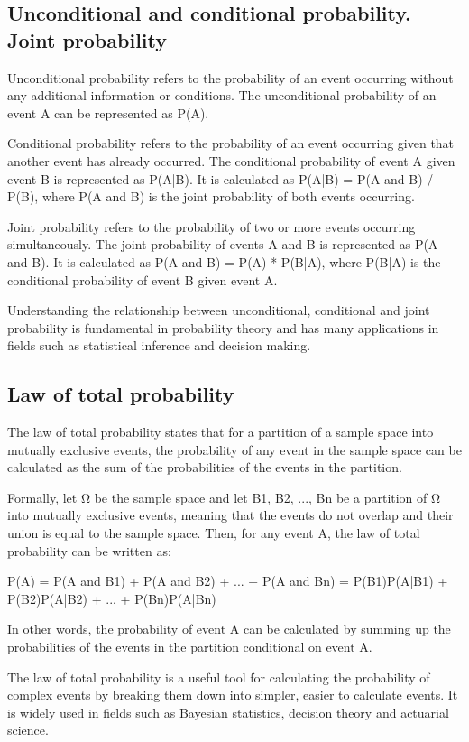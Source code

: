 \documentclass[12pt, a4paper, oneside]{article}
\begin{document}
\subsection{ Unconditional and conditional probability. Joint probability }
Unconditional probability refers to the probability of an event occurring without any additional information or conditions. The unconditional probability of an event A can be represented as P(A).

Conditional probability refers to the probability of an event occurring given that another event has already occurred. The conditional probability of event A given event B is represented as P(A|B). It is calculated as P(A|B) = P(A and B) / P(B), where P(A and B) is the joint probability of both events occurring.

Joint probability refers to the probability of two or more events occurring simultaneously. The joint probability of events A and B is represented as P(A and B). It is calculated as P(A and B) = P(A) * P(B|A), where P(B|A) is the conditional probability of event B given event A.

Understanding the relationship between unconditional, conditional and joint probability is fundamental in probability theory and has many applications in fields such as statistical inference and decision making.
\subsection{ Law of total probability }
The law of total probability states that for a partition of a sample space into mutually exclusive events, the probability of any event in the sample space can be calculated as the sum of the probabilities of the events in the partition.

Formally, let Ω be the sample space and let {B1, B2, ..., Bn} be a partition of Ω into mutually exclusive events, meaning that the events do not overlap and their union is equal to the sample space. Then, for any event A, the law of total probability can be written as:

P(A) = P(A and B1) + P(A and B2) + ... + P(A and Bn) = P(B1)P(A|B1) + P(B2)P(A|B2) + ... + P(Bn)P(A|Bn)

In other words, the probability of event A can be calculated by summing up the probabilities of the events in the partition conditional on event A.

The law of total probability is a useful tool for calculating the probability of complex events by breaking them down into simpler, easier to calculate events. It is widely used in fields such as Bayesian statistics, decision theory and actuarial science.
\end{document}

